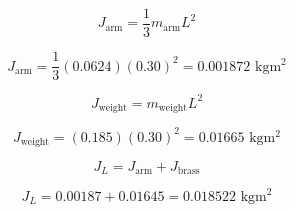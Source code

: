 \documentclass{article}
\begin{document}
\begin{equation}
    J_{\text{arm}} = \frac{1}{3} m_{\text{arm}} L^2
\end{equation}

\begin{equation}
    J_{\text{arm}} = \frac{1}{3} (0.0624) (0.30)^2 = 0.001872 \text{ kg}\text{m}^2
\end{equation}

\begin{equation}
    J_{\text{weight}} = m_{\text{weight}} L^2
\end{equation}

\begin{equation}
    J_{\text{weight}} = (0.185) (0.30)^2 = 0.01665 \text{ kg}\text{m}^2
\end{equation}

\begin{equation}
    J_L = J_{\text{arm}} + J_{\text{brass}}
\end{equation}

\begin{equation}
    J_L = 0.00187 + 0.01645 = 0.018522 \text{ kg}\text{m}^2
\end{equation}

    
\end{document}
